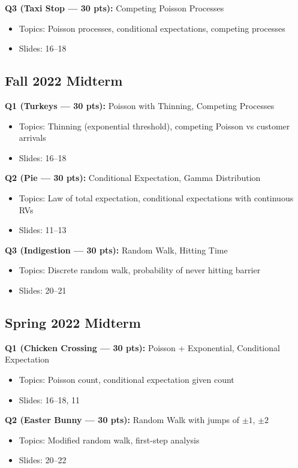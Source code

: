 \documentclass[11pt,letterpaper]{article}
\begin{document}
\textbf{Q3 (Taxi Stop --- 30 pts):} Competing Poisson Processes
\begin{itemize}
  \item Topics: Poisson processes, conditional expectations, competing processes
  \item Slides: 16--18
\end{itemize}

\subsection{Fall 2022 Midterm}

\textbf{Q1 (Turkeys --- 30 pts):} Poisson with Thinning, Competing Processes
\begin{itemize}
  \item Topics: Thinning (exponential threshold), competing Poisson vs customer arrivals
  \item Slides: 16--18
\end{itemize}

\textbf{Q2 (Pie --- 30 pts):} Conditional Expectation, Gamma Distribution
\begin{itemize}
  \item Topics: Law of total expectation, conditional expectations with continuous RVs
  \item Slides: 11--13
\end{itemize}

\textbf{Q3 (Indigestion --- 30 pts):} Random Walk, Hitting Time
\begin{itemize}
  \item Topics: Discrete random walk, probability of never hitting barrier
  \item Slides: 20--21
\end{itemize}

\subsection{Spring 2022 Midterm}

\textbf{Q1 (Chicken Crossing --- 30 pts):} Poisson + Exponential, Conditional Expectation
\begin{itemize}
  \item Topics: Poisson count, conditional expectation given count
  \item Slides: 16--18, 11
\end{itemize}

\textbf{Q2 (Easter Bunny --- 30 pts):} Random Walk with jumps of $\pm 1$, $\pm 2$
\begin{itemize}
  \item Topics: Modified random walk, first-step analysis
  \item Slides: 20--22
\end{itemize}
\end{document}
